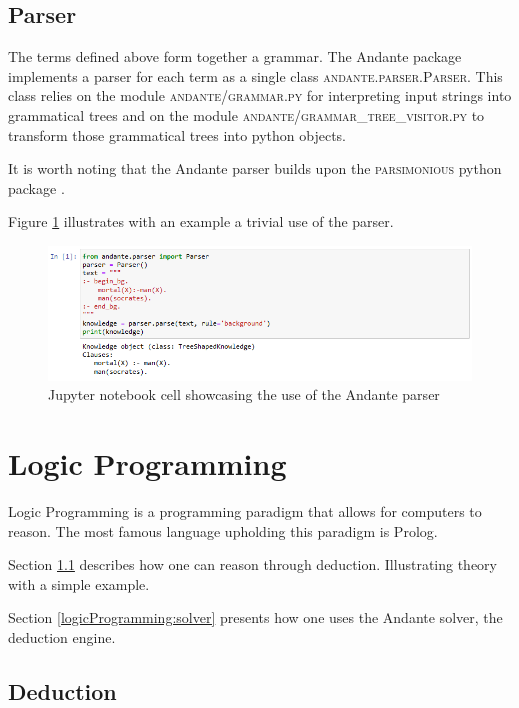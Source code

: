 \documentclass{article}
\begin{document}
\subsection{Parser} \label{terminology:parser}

The terms defined above form together a grammar. The Andante package implements
a parser for each term as a single class \textsc{andante.parser.Parser}. This 
class relies on the module \textsc{andante/grammar.py} for interpreting input strings
into grammatical trees and on the module \textsc{andante/grammar\_tree\_visitor.py} to
transform those grammatical trees into python objects.

It is worth noting that the Andante parser builds upon the 
\textsc{parsimonious} python package \cite{parsimonious}.

Figure \ref{parserexample} illustrates with an example a trivial use of the 
parser.

\begin{figure}[h!]
    \includegraphics[width = \textwidth]{images/Parser example.PNG}
    \caption{Jupyter notebook cell showcasing the use of the Andante parser}
    \label{parserexample}
\end{figure}



\newpage
\section{Logic Programming} \label{logicProgramming}

Logic Programming is a programming paradigm that allows for computers to
reason. The most famous language upholding this paradigm is Prolog. 

Section \ref{logicProgramming:deduction} describes how one can reason through
deduction. Illustrating theory with a simple example.

Section \ref{logicProgramming:solver} presents how one uses the Andante solver,
the deduction engine.

\subsection{Deduction} \label{logicProgramming:deduction}
\end{document}
